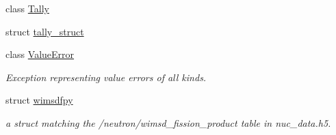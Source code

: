 \begin{DoxyCompactItemize}
class \hyperlink{classpyne_1_1_tally}{Tally}
\item 
struct \hyperlink{structpyne_1_1tally__struct}{tally\+\_\+struct}
\item 
class \hyperlink{classpyne_1_1_value_error}{Value\+Error}
\begin{DoxyCompactList}\small\item\em Exception representing value errors of all kinds. \end{DoxyCompactList}\item 
struct \hyperlink{structpyne_1_1wimsdfpy}{wimsdfpy}
\begin{DoxyCompactList}\small\item\em a struct matching the \textquotesingle{}/neutron/wimsd\+\_\+fission\+\_\+product\textquotesingle{} table in nuc\+\_\+data.\+h5. \end{DoxyCompactList}\end{DoxyCompactItemize}

